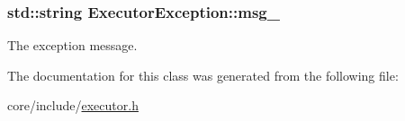 \subsubsection[{msg\+\_\+}]{\setlength{\rightskip}{0pt plus 5cm}std\+::string Executor\+Exception\+::msg\+\_\+\hspace{0.3cm}{\ttfamily [private]}}\label{classExecutorException_a7de585a1cc08621e9303275a2b944cf5}
The exception message. 

The documentation for this class was generated from the following file\+:\begin{DoxyCompactItemize}
\item 
core/include/\hyperlink{executor_8h}{executor.\+h}\end{DoxyCompactItemize}
